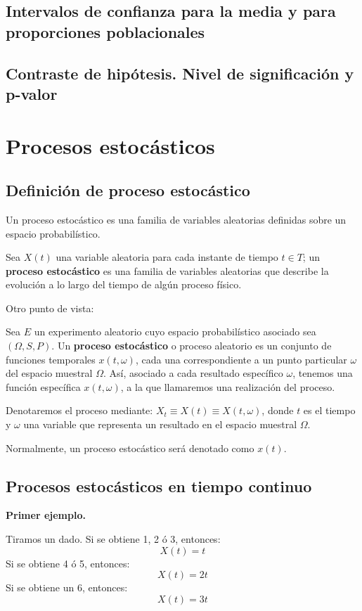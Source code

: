 \documentclass[a4paper]{book}
\begin{document}
\section{Intervalos de confianza para la media y para proporciones poblacionales}

\section{Contraste de hipótesis. Nivel de significación y p-valor}



\chapter{Procesos estocásticos}

\section{Definición de proceso estocástico}
Un proceso estocástico es una familia de variables aleatorias definidas sobre un espacio probabilístico.

Sea $X(t)$ una variable aleatoria para cada instante de tiempo $t\in T$; un \textbf{proceso estocástico} es una familia de variables aleatorias que describe la evolución a lo largo del tiempo de algún proceso físico.

Otro punto de vista:

Sea $E$ un experimento aleatorio cuyo espacio probabilístico asociado sea $(\Omega , S, P)$. Un \textbf{proceso estocástico} o proceso aleatorio es un conjunto de funciones temporales $x(t,\omega )$, cada una correspondiente a un punto particular $\omega$ del espacio muestral $\Omega$. Así, asociado a cada resultado específico $\omega$, tenemos una función específica $x(t,\omega )$, a la que llamaremos una realización del proceso.

Denotaremos el proceso mediante: $X_t\equiv X(t) \equiv X(t,\omega )$, donde $t$ es el tiempo y $\omega$ una variable que representa un resultado en el espacio muestral $\Omega$.

Normalmente, un proceso estocástico será denotado como $x(t)$.

\section{Procesos estocásticos en tiempo continuo}
\textbf{Primer ejemplo.}

Tiramos un dado. Si se obtiene 1, 2 ó 3, entonces:
\[X(t) = t\]
Si se obtiene 4 ó 5, entonces:
\[X(t) = 2t\]
Si se obtiene un 6, entonces:
\[X(t) = 3t\]
\end{document}
